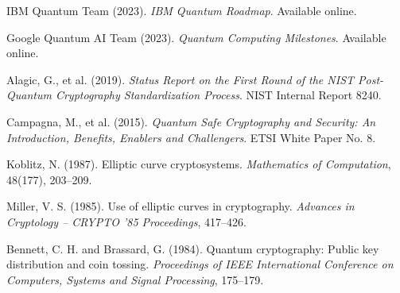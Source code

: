 \documentclass[12pt,a4paper]{article}
\begin{document}
\begin{thebibliography}{99}
		IBM Quantum Team (2023). \textit{IBM Quantum Roadmap}. Available online.
		
		Google Quantum AI Team (2023). \textit{Quantum Computing Milestones}. Available online.
		
		Alagic, G., et al. (2019). \textit{Status Report on the First Round of the NIST Post-Quantum Cryptography Standardization Process}. NIST Internal Report 8240.
		
		Campagna, M., et al. (2015). \textit{Quantum Safe Cryptography and Security: An Introduction, Benefits, Enablers and Challengers}. ETSI White Paper No. 8.
		
		Koblitz, N. (1987). Elliptic curve cryptosystems. \textit{Mathematics of Computation}, 48(177), 203--209.
		
		Miller, V. S. (1985). Use of elliptic curves in cryptography. \textit{Advances in Cryptology -- CRYPTO '85 Proceedings}, 417--426.
		
		Bennett, C. H. and Brassard, G. (1984). Quantum cryptography: Public key distribution and coin tossing. \textit{Proceedings of IEEE International Conference on Computers, Systems and Signal Processing}, 175--179.
	\end{thebibliography}
	
\end{document}
